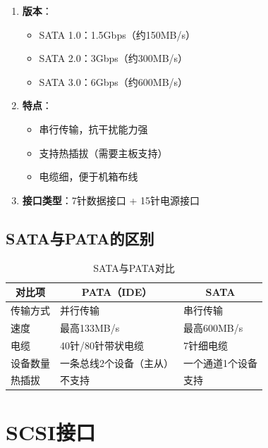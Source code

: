 \documentclass[12pt,UTF8]{ctexbook}
\begin{document}
\begin{enumerate}
    \item \textbf{版本}：
    \begin{itemize}[leftmargin=2em]
        \item SATA 1.0：1.5Gbps（约150MB/s）
        \item SATA 2.0：3Gbps（约300MB/s）
        \item SATA 3.0：6Gbps（约600MB/s）
    \end{itemize}
    
    \item \textbf{特点}：
    \begin{itemize}[leftmargin=2em]
        \item 串行传输，抗干扰能力强
        \item 支持热插拔（需要主板支持）
        \item 电缆细，便于机箱布线
    \end{itemize}
    
    \item \textbf{接口类型}：7针数据接口 + 15针电源接口
\end{enumerate}

\section{SATA与PATA的区别}

\begin{table}[H]
    \centering
    \begin{tabularx}{\textwidth}{|p{4cm}|X|X|}
        \hline
        \multicolumn{1}{|c|}{\textbf{对比项}} & \multicolumn{1}{c|}{\textbf{PATA（IDE）}} & \multicolumn{1}{c|}{\textbf{SATA}} \\
        \hline
        传输方式 & 并行传输 & 串行传输 \\
        \hline
        速度 & 最高133MB/s & 最高600MB/s \\
        \hline
        电缆 & 40针/80针带状电缆 & 7针细电缆 \\
        \hline
        设备数量 & 一条总线2个设备（主从） & 一个通道1个设备 \\
        \hline
        热插拔 & 不支持 & 支持 \\
        \hline
    \end{tabularx}
    \caption{SATA与PATA对比}
    \label{tab:sata_vs_pata}
\end{table}

\chapter{SCSI接口}
\end{document}
